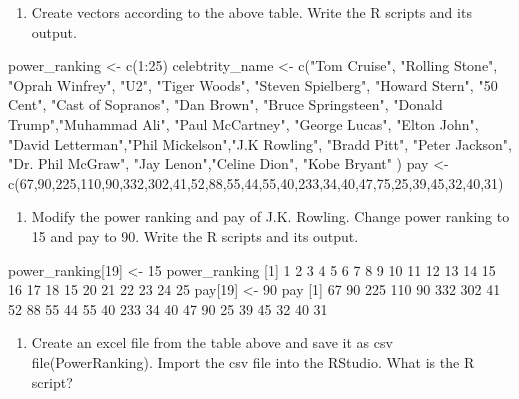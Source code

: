 \documentclass[
]{article}
\newenvironment{Shaded}{\begin{snugshade}}{\end{snugshade}}
\newcommand{\NormalTok}[1]{#1}
\providecommand{\tightlist}{%
  \setlength{\itemsep}{0pt}\setlength{\parskip}{0pt}}
\begin{document}
\begin{enumerate}
\def\labelenumi{\alph{enumi}.}
\tightlist
\item
  Create vectors according to the above table. Write the R scripts and
  its output.
\end{enumerate}

\begin{Shaded}
\begin{Highlighting}[]
\NormalTok{power\_ranking   \textless{}{-} c(1:25)}
\NormalTok{celebtrity\_name \textless{}{-} c("Tom Cruise", "Rolling Stone", "Oprah Winfrey", "U2", "Tiger Woods", "Steven Spielberg", }
\NormalTok{                     "Howard Stern", "50 Cent", "Cast of Sopranos", "Dan Brown", "Bruce Springsteen", }
\NormalTok{                     "Donald Trump","Muhammad Ali", "Paul McCartney", "George Lucas", "Elton John", }
\NormalTok{                     "David Letterman","Phil Mickelson","J.K Rowling", "Bradd Pitt", "Peter Jackson", }
\NormalTok{                     "Dr. Phil McGraw", "Jay Lenon","Celine Dion", "Kobe Bryant" )}
\NormalTok{pay             \textless{}{-} c(67,90,225,110,90,332,302,41,52,88,55,44,55,40,233,34,40,47,75,25,39,45,32,40,31)}
\end{Highlighting}
\end{Shaded}

\begin{enumerate}
\def\labelenumi{\alph{enumi}.}
\setcounter{enumi}{1}
\tightlist
\item
  Modify the power ranking and pay of J.K. Rowling. Change power ranking
  to 15 and pay to 90. Write the R scripts and its output.
\end{enumerate}

\begin{Shaded}
\begin{Highlighting}[]
\NormalTok{power\_ranking[19] \textless{}{-} 15}
\NormalTok{power\_ranking }
\NormalTok{[1]  1  2  3  4  5  6  7  8  9 10 11 12 13 14 15 16 17 18 15 20 21 22 23 24 25}
\NormalTok{pay[19] \textless{}{-} 90}
\NormalTok{pay }
\NormalTok{[1]  67  90 225 110  90 332 302  41  52  88  55  44  55  40 233  34  40  47  90  25  39  45  32  40  31}
\end{Highlighting}
\end{Shaded}

\begin{enumerate}
\def\labelenumi{\alph{enumi}.}
\setcounter{enumi}{2}
\tightlist
\item
  Create an excel file from the table above and save it as csv
  file(PowerRanking). Import the csv file into the RStudio. What is the
  R script?
\end{enumerate}
\end{document}
